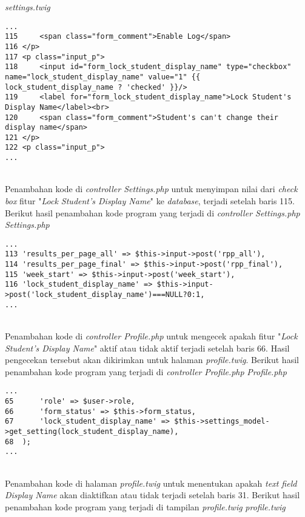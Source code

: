 \textit{settings.twig}
\begin{lstlisting}[basicstyle=\ttfamily, frame=single,
columns=fullflexible, keepspaces=true, breaklines=true]
...
115		<span class="form_comment">Enable Log</span>
116	</p>
117	<p class="input_p">
118		<input id="form_lock_student_display_name" type="checkbox" name="lock_student_display_name" value="1" {{ lock_student_display_name ? 'checked' }}/>
119		<label for="form_lock_student_display_name">Lock Student's Display Name</label><br>
120		<span class="form_comment">Student's can't change their display name</span>
121	</p>
122	<p class="input_p">
...
\end{lstlisting}
~\\
Penambahan kode di \textit{controller Settings.php} untuk menyimpan nilai dari \textit{check box} fitur "\textit{Lock Student's Display Name}" ke \textit{database}, terjadi setelah baris 115. Berikut hasil penambahan kode program yang terjadi di \textit{controller Settings.php}
\textit{Settings.php}
\begin{lstlisting}[basicstyle=\ttfamily, frame=single,
columns=fullflexible, keepspaces=true, breaklines=true]
...
113	'results_per_page_all' => $this->input->post('rpp_all'),
114	'results_per_page_final' => $this->input->post('rpp_final'),
115	'week_start' => $this->input->post('week_start'),
116	'lock_student_display_name' => $this->input->post('lock_student_display_name')===NULL?0:1,
...
\end{lstlisting}
~\\
Penambahan kode di \textit{controller Profile.php} untuk mengecek apakah fitur "\textit{Lock Student's Display Name}" aktif atau tidak aktif terjadi setelah baris 66. Hasil pengecekan tersebut akan dikirimkan untuk halaman \textit{profile.twig}. Berikut hasil penambahan kode program yang terjadi di \textit{controller} \textit{Profile.php}
\textit{Profile.php}
\begin{lstlisting}[basicstyle=\ttfamily, frame=single,
columns=fullflexible, keepspaces=true, breaklines=true]
...
65		'role' => $user->role,
66		'form_status' => $this->form_status,
67		'lock_student_display_name' => $this->settings_model->get_setting(lock_student_display_name),
68	);
...
\end{lstlisting}
~\\
Penambahan kode di halaman \textit{profile.twig} untuk menentukan apakah \textit{text field Display Name} akan diaktifkan atau tidak terjadi setelah baris 31. Berikut hasil penambahan kode program yang terjadi di tampilan \textit{profile.twig}
\textit{profile.twig}
